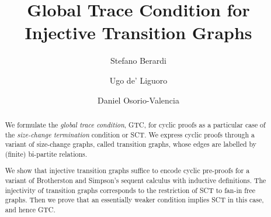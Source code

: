 \documentclass[a4paper,UKenglish,cleveref, autoref, thm-restate]{lipics-v2021}
\title{Global Trace Condition for Injective Transition Graphs} %
\author{Stefano Berardi}
           {University of Turin, Turin, Italy}
           {stefano.berardi@unito.it}
           {}
           {}
\author{Ugo {de' Liguoro}}
           {University of Turin, Turin, Italy}
           {ugo.deliguoro@unito.it}
           {https://orcid.org/0000-0003-4609-2783}
           {}
\author{Daniel Osorio-Valencia}
           {University of Turin, Turin, Italy}
           {danielfabian.osoriovalencia@unito.it}
           {https://orcid.org/0009-0002-4820-1867}
           {}
\begin{document}
\maketitle

\begin{abstract}
%
We formulate the {\em global trace condition}, GTC, for cyclic proofs as a particular case of the {\em size-change termination} condition or SCT. We express cyclic proofs through a variant of size-change graphs, called transition graphs, whose edges are labelled by (finite) bi-partite relations. 

We show that injective transition graphs suffice to encode cyclic pre-proofs for a variant of Brotherston and Simpson's sequent calculus with inductive definitions. 
The injectivity of transition graphs corresponds to the restriction of SCT to fan-in free graphs.
Then we prove that an essentially weaker condition implies SCT in this case, and hence GTC.
\end{abstract}














\newpage


\end{document}
